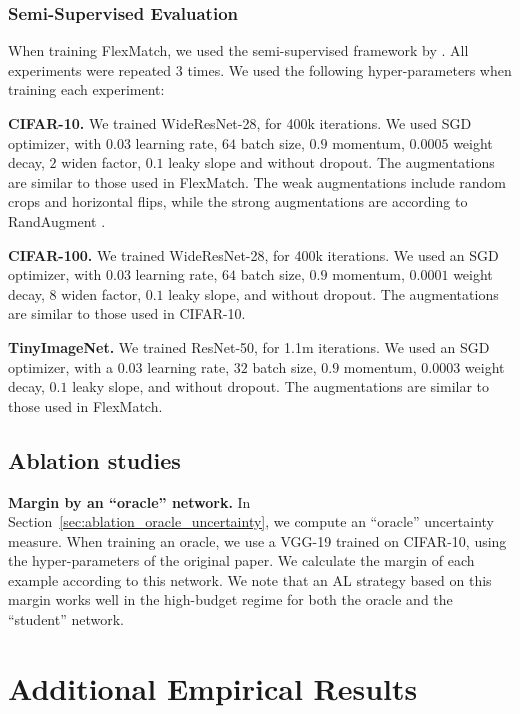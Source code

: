 \documentclass{article}
\newcommand{\myparagraph}[1]{\smallskip\noindent\textbf{#1}}
\begin{document}
\subsubsection{Semi-Supervised Evaluation}
\label{app:semi_implementation}
When training FlexMatch, we used the semi-supervised framework by \citet{DBLP:journals/corr/abs-2110-08263}. All experiments were repeated 3 times.
We used the following hyper-parameters when training each experiment:

\myparagraph{CIFAR-10.} We trained WideResNet-28, for 400k iterations. We used SGD optimizer, with $0.03$ learning rate, $64$ batch size, $0.9$ momentum, $0.0005$ weight decay, $2$ widen factor, $0.1$ leaky slope and without dropout. 
The augmentations are similar to those used in FlexMatch. The weak augmentations include random crops and horizontal flips, while the strong augmentations are according to RandAugment \citep{cubuk2020randaugment}.

\myparagraph{CIFAR-100.} We trained WideResNet-28, for 400k iterations. We used an SGD optimizer, with $0.03$ learning rate, $64$ batch size, $0.9$ momentum, $0.0001$ weight decay, $8$ widen factor, $0.1$ leaky slope, and without dropout. The augmentations are similar to those used in CIFAR-10.

\myparagraph{TinyImageNet.} We trained ResNet-50, for 1.1m iterations. We used an SGD optimizer, with a $0.03$ learning rate, $32$ batch size, $0.9$ momentum, $0.0003$ weight decay, $0.1$ leaky slope, and without dropout. The augmentations are similar to those used in FlexMatch.

\subsection{Ablation studies}
\label{app:sec:ablation_details}
\myparagraph{Margin by an ``oracle'' network.} In Section~\ref{sec:ablation_oracle_uncertainty}, we compute an ``oracle'' uncertainty measure. When training an oracle, we use a VGG-19 \citep{simonyan2014very} trained on CIFAR-10, using the hyper-parameters of the original paper. We calculate the margin of each example according to this network. We note that an AL strategy based on this margin works well in the high-budget regime for both the oracle and the ``student'' network.

\section{Additional Empirical Results}
\label{app:more_empirical}
\end{document}
